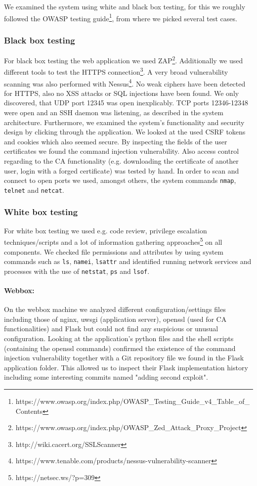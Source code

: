 \documentclass[english]{article}
\newcommand{\code}[1]{\texttt{#1}}
\begin{document}
We examined the system using white and black box testing, for this we roughly followed the OWASP testing guide\footnote{https://www.owasp.org/index.php/OWASP\_Testing\_Guide\_v4\_Table\_of\_Contents}, from where we picked several test cases.

\subsubsection{Black box testing}
For black box testing the web application we used ZAP\footnote{https://www.owasp.org/index.php/OWASP\_Zed\_Attack\_Proxy\_Project}. Additionally we used different tools to test the HTTPS connection\footnote{http://wiki.cacert.org/SSLScanner}. A very broad vulnerability scanning was also performed with Nessus\footnote{https://www.tenable.com/products/nessus-vulnerability-scanner}. No weak ciphers have been detected for HTTPS, also no XSS attacks or SQL injections have been found. We only discovered, that UDP port 12345 was open inexplicably. TCP ports 12346-12348 were open and an SSH daemon was listening, as described in the system architecture. Furthermore, we examined the system's functionality and security design by clicking through the application. We looked at the used CSRF tokens and cookies which also seemed secure. By inspecting the fields of the user certificates we found the command injection vulnerability. Also access control regarding to the CA functionality (e.g. downloading the certificate of another user, login with a forged certificate) was tested by hand. In order to scan and connect to open ports we used, amongst others, the system commands \code{nmap}, \code{telnet} and \code{netcat}.


\subsubsection{White box testing}
For white box testing we used e.g. code review, privilege escalation techniques/scripts and a lot of information gathering approaches\footnote{https://netsec.ws/?p=309} on all components. We checked file permissions and attributes by using system commands such as \code{ls}, \code{namei}, \code{lsattr} and identified running network services and processes with the use of \code{netstat}, \code{ps} and \code{lsof}. 
\paragraph{Webbox:} On the webbox machine we analyzed different configuration/settings files including those of nginx, uwsgi (application server), openssl (used for CA functionalities) and Flask but could not find any suspicious or unusual configuration. Looking at the application's python files and the shell scripts (containing the openssl commands) confirmed the existence of the command injection vulnerability together with a Git repository file  we found in the Flask application folder. This allowed us to inspect their Flask implementation history including some interesting commits named "adding second exploit".
\end{document}
